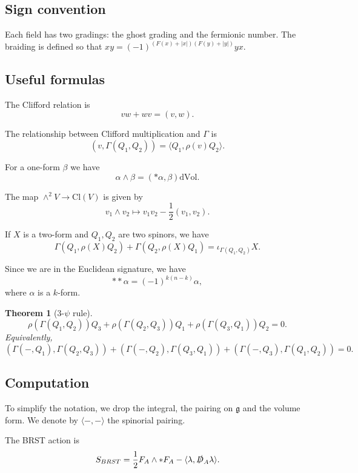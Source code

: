 \documentclass[12pt]{amsart}
\newcommand{\dvol}{\mathrm{dVol}}
\newcommand{\sD}{\slashed{D}}
\newcommand{\g}{\mathfrak{g}}
\newtheorem{thm}{Theorem}[section]
\begin{document}
\section{}

\subsection{Sign convention}

Each field has two gradings: the ghost grading and the fermionic number. The braiding is defined so that $xy = (-1)^{(F(x) + |x|)(F(y)+|y|)} yx$.

\subsection{Useful formulas} The Clifford relation is
\[vw + wv = (v, w).\]

The relationship between Clifford multiplication and $\Gamma$ is
\[(v, \Gamma(Q_1, Q_2)) = \langle Q_1, \rho(v) Q_2\rangle.\]

For a one-form $\beta$ we have
\[\alpha\wedge \beta = (\ast\alpha, \beta)\dvol.\]

The map $\wedge^2 V\rightarrow \mathrm{Cl}(V)$ is given by
\[v_1\wedge v_2\mapsto v_1v_2 - \frac{1}{2}(v_1, v_2).\]

If $X$ is a two-form and $Q_1, Q_2$ are two spinors, we have
\[\Gamma(Q_1, \rho(X) Q_2) + \Gamma(Q_2, \rho(X) Q_1) = \iota_{\Gamma(Q_1, Q_2)} X.\]

Since we are in the Euclidean signature, we have
\[\ast\ast\alpha = (-1)^{k(n-k)} \alpha,\]
where $\alpha$ is a $k$-form.

\begin{thm}[3-$\psi$ rule]
\[\rho(\Gamma(Q_1, Q_2))Q_3 + \rho(\Gamma(Q_2, Q_3))Q_1 + \rho(\Gamma(Q_3, Q_1))Q_2 = 0.\]
Equivalently,
\[(\Gamma(-, Q_1), \Gamma(Q_2, Q_3)) + (\Gamma(-, Q_2), \Gamma(Q_3, Q_1)) + (\Gamma(-, Q_3), \Gamma(Q_1, Q_2)) = 0.\]
\label{thm:3psi}
\end{thm}

\subsection{Computation}
To simplify the notation, we drop the integral, the pairing on $\g$ and the volume form. We denote by $\langle-, -\rangle$ the spinorial pairing.

The BRST action is
\[S_{BRST} = \frac{1}{2} F_A\wedge \ast F_A - \langle\lambda, \sD_A\lambda\rangle.\]
\end{document}
